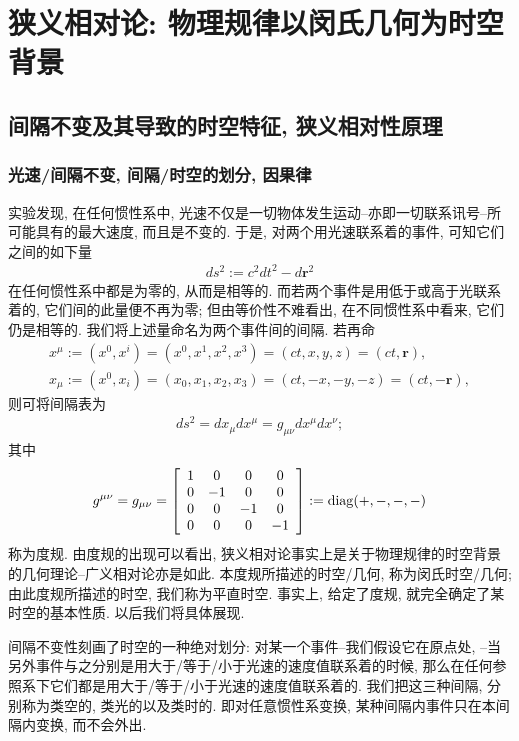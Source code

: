 
\section{狭义相对论: 物理规律以闵氏几何为时空背景}

\subsection{间隔不变及其导致的时空特征, 狭义相对性原理}

\subsubsection{光速/间隔不变, 间隔/时空的划分, 因果律}

实验发现, 在任何惯性系中, 光速不仅是一切物体发生运动--亦即一切联系讯号--所可能具有的最大速度, 而且是不变的. 于是, 对两个用光速联系着的事件, 可知它们之间的如下量
\begin{align}
ds^2:=c^2dt^2-d\bm{r}^2
\end{align}
在任何惯性系中都是为零的, 从而是相等的. 而若两个事件是用低于或高于光联系着的, 它们间的此量便不再为零; 但由等价性不难看出, 在不同惯性系中看来, 它们仍是相等的. 我们将上述量命名为两个事件间的间隔. 若再命
\begin{gather}
x^\mu:=(x^0,x^i)=(x^0,x^1,x^2,x^3)=(ct,x,y,z)=(ct,\bm{r}),\\
x_\mu:=(x^0,x_i)=(x_0,x_1,x_2,x_3)=(ct,-x,-y,-z)=(ct,-\bm{r}),
\end{gather}
则可将间隔表为
\begin{gather}
ds^2=dx_\mu dx^\mu=g_{\mu\nu}dx^\mu dx^\nu;
\end{gather}
其中
\begin{align}
g^{\mu\nu}=g_{\mu\nu}=\left[\begin{array}{cccc}1&0&0&0\\0&-1&0&0\\0&0&-1&0\\0&0&0&-1\end{array}\right]:=\rm{diag}(+,-,-,-)
\end{align}
称为度规. 由度规的出现可以看出, 狭义相对论事实上是关于物理规律的时空背景的几何理论--广义相对论亦是如此. 本度规所描述的时空/几何, 称为闵氏时空/几何; 由此度规所描述的时空, 我们称为平直时空. 事实上, 给定了度规, 就完全确定了某时空的基本性质. 以后我们将具体展现.


间隔不变性刻画了时空的一种绝对划分: 对某一个事件--我们假设它在原点处, --当另外事件与之分别是用大于/等于/小于光速的速度值联系着的时候, 那么在任何参照系下它们都是用大于/等于/小于光速的速度值联系着的. 我们把这三种间隔, 分别称为类空的, 类光的以及类时的. 即对任意惯性系变换, 某种间隔内事件只在本间隔内变换, 而不会外出.


